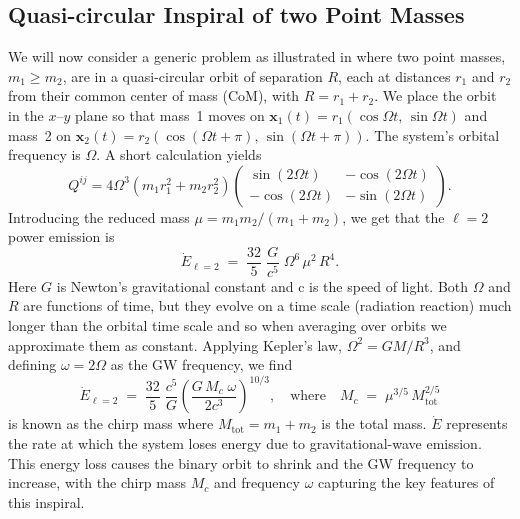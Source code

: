 \documentclass{ucdgradtaughtthesis}
\begin{document}
\subsection{Quasi-circular Inspiral of two Point Masses}
\label{subsec:two_mass_example}
We will now consider a generic problem as illustrated in \cite{intoGRSarp} where two point masses, \(m_1 \ge m_2\), are in a quasi-circular orbit of separation \(R\),
each at distances \(r_1\) and \(r_2\) from their common center of mass (CoM), with
\(R = r_1 + r_2\). We place the orbit in the \(x\)--\(y\) plane so that mass~1 moves on
\(\mathbf{x}_1(t) = r_1(\cos\Omega t,\,\sin\Omega t)\) and mass~2 on
\(\mathbf{x}_2(t) = r_2(\cos(\Omega t+\pi),\,\sin(\Omega t+\pi))\). The system’s orbital
frequency is \(\Omega\). A short calculation yields
%
\begin{equation}
    Q^{ij} = 4 \Omega^3 \left(m_1 r_1^2 + m_2 r_2^2\right)
    \begin{pmatrix}
    \sin(2\Omega t) & -\cos(2\Omega t) \\
    -\cos(2\Omega t) & -\sin(2\Omega t)
    \end{pmatrix}.
\end{equation}
%
%
Introducing the reduced mass \(\mu = m_1 m_2/(m_1 + m_2)\), we get that the \(\ell=2\) power emission is
%
\begin{equation}\label{eq:E_dot_2}
\dot{E}_{\ell=2}
\;=\;
\frac{32}{5}\;\frac{G}{c^5}\;\Omega^6\,\mu^2\,R^4.
\end{equation}
Here \(G\) is Newton's gravitational constant and c is the speed of light. Both \(\Omega\) and \(R\) are functions of time, but they evolve on a time scale (radiation reaction) much longer than the orbital time
scale and so when averaging over orbits we approximate them as constant. Applying Kepler’s law, \(\Omega^2 = GM/R^3\), and defining
\(\omega = 2\Omega\) as the GW frequency, we find
%
%
\begin{equation}
\dot{E}_{\ell=2}
\;=\;
\frac{32}{5}\;\frac{c^5}{G}
\left(\frac{G\, M_c \;\omega}{2c^3}\right)^{10/3},
\quad
\text{where}
\quad
M_c \;=\;\mu^{3/5}\,M_{\text{tot}}^{2/5}
\label{eq:Energy}
\end{equation}
%
is known as the chirp mass where $M_{\text{tot}} = m_1+m_2$ is the total mass.
%
%
$ \dot{E} $ represents the rate at which the system loses energy due to gravitational-wave emission.
This energy loss causes the binary orbit to shrink and the GW frequency to increase, 
with the chirp mass \(M_c\) and frequency \(\omega\) capturing the key features of this inspiral.
%
\end{document}

